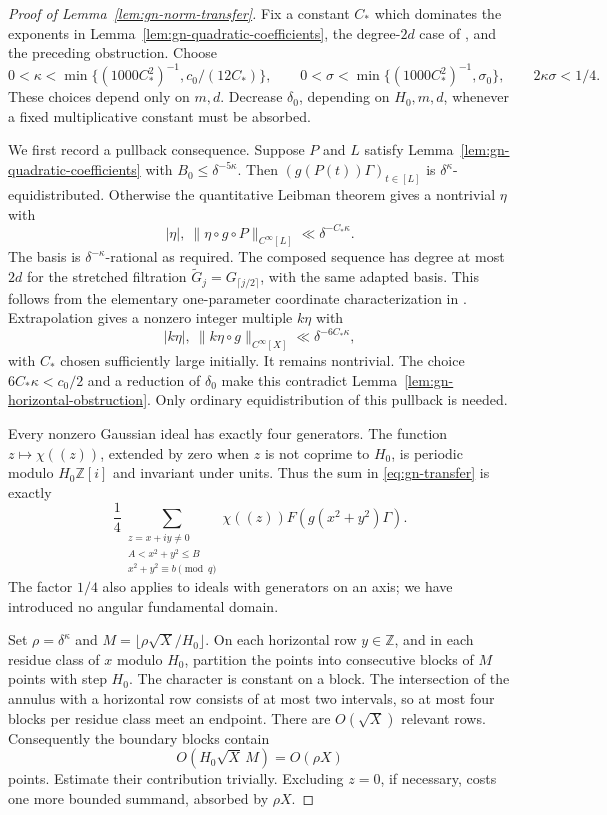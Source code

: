 \begin{proof}[Proof of Lemma~\ref{lem:gn-norm-transfer}]
Fix a constant $C_*$ which dominates the exponents in
Lemma~\ref{lem:gn-quadratic-coefficients}, the degree-$2d$ case of
\cite[Theorem 2.9]{GTOrbits2012}, and the preceding obstruction.
Choose
\[
 0<\kappa<\min\{(1000C_*^2)^{-1},c_0/(12C_*)\},\qquad
 0<\sigma<\min\{(1000C_*^2)^{-1},\sigma_0\},
 \qquad 2\kappa\sigma<1/4.
\]
These choices depend only on $m,d$. Decrease $\delta_0$, depending on
$H_0,m,d$, whenever a fixed multiplicative constant must be absorbed.

We first record a pullback consequence. Suppose $P$ and $L$ satisfy
Lemma~\ref{lem:gn-quadratic-coefficients} with
$B_0\leq\delta^{-5\kappa}$. Then
$(g(P(t))\Gamma)_{t\in[L]}$ is $\delta^\kappa$-equidistributed.
Otherwise the quantitative Leibman theorem gives a nontrivial $\eta$
with
\[
 |\eta|,\ \|\eta\circ g\circ P\|_{C^\infty[L]}
     \ll\delta^{-C_*\kappa}.
\]
The basis is $\delta^{-\kappa}$-rational as required. The composed
sequence has degree at most $2d$ for the stretched filtration
$\widetilde G_j=G_{\lceil j/2\rceil}$, with the same adapted basis.
This follows from the elementary one-parameter coordinate
characterization in \cite[Lemma 6.7]{GTOrbits2012}.
Extrapolation gives a nonzero integer multiple $k\eta$ with
\[
 |k\eta|,\ \|k\eta\circ g\|_{C^\infty[X]}
       \ll\delta^{-6C_*\kappa},
\]
with $C_*$ chosen sufficiently large initially. It remains nontrivial. The choice
$6C_*\kappa<c_0/2$ and a reduction of $\delta_0$ make this contradict
Lemma~\ref{lem:gn-horizontal-obstruction}. Only ordinary
equidistribution of this pullback is needed.

Every nonzero Gaussian ideal has exactly four generators. The function
$z\mapsto\chi((z))$, extended by zero when $z$ is not coprime to $H_0$,
is periodic modulo $H_0\mathbb Z[i]$ and invariant under units. Thus the
sum in \eqref{eq:gn-transfer} is exactly
\[
 \frac14\sum_{\substack{z=x+iy\ne0\\A<x^2+y^2\leq B\\
                         x^2+y^2\equiv b\pmod q}}
       \chi((z))F(g(x^2+y^2)\Gamma).
\]
The factor $1/4$ also applies to ideals with generators on an axis;
we have introduced no angular fundamental domain.

Set $\rho=\delta^\kappa$ and
$M=\lfloor\rho\sqrt X/H_0\rfloor$. On each horizontal row $y\in
\mathbb Z$, and in each residue class of $x$ modulo $H_0$, partition
the points into consecutive blocks of $M$ points with step $H_0$.
The character is constant on a block. The intersection of the annulus
with a horizontal row consists of at most two intervals, so at most
four blocks per residue class meet an endpoint. There are $O(\sqrt X)$
relevant rows. Consequently the boundary blocks contain
\[
 O(H_0\sqrt X\,M)=O(\rho X)
\]
points. Estimate their contribution trivially. Excluding $z=0$, if
necessary, costs one more bounded summand, absorbed by $\rho X$.


\end{proof}
